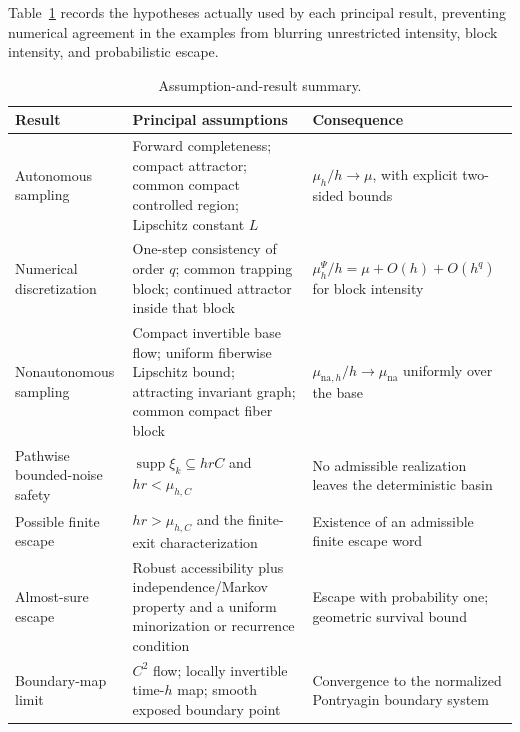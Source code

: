 \documentclass[pdflatex,sn-mathphys-num]{sn-jnl}
\numberwithin{equation}{section}
\theoremstyle{thmstyleone}%
\theoremstyle{definition}
\theoremstyle{remark}
\begin{document}
Table~\ref{tab:assumption-result-summary} records the hypotheses actually used by each principal result, preventing numerical agreement in the examples from blurring unrestricted intensity, block intensity, and probabilistic escape.

\begin{table}[htbp]
    \centering
    \caption{Assumption-and-result summary.}
    \label{tab:assumption-result-summary}
    \begin{tabular}{@{}p{.22\linewidth} p{.36\linewidth} p{.36\linewidth}@{}}
        \toprule
        Result & Principal assumptions & Consequence\\
        \midrule
        Autonomous sampling
        &
        Forward completeness; compact attractor; common compact controlled
        region; Lipschitz constant \(L\)
        &
        \(\mu_h/h\to\mu\), with explicit two-sided bounds
        \\
        Numerical discretization
        &
        One-step consistency of order \(q\); common trapping block;
        continued attractor inside that block
        &
        \(\mu_h^\Psi/h=\mu+O(h)+O(h^q)\) for block intensity
        \\
        Nonautonomous sampling
        &
        Compact invertible base flow; uniform fiberwise Lipschitz bound;
        attracting invariant graph; common compact fiber block
        &
        \(\mu_{\mathrm{na},h}/h\to\mu_{\mathrm{na}}\) uniformly over the base
        \\
        Pathwise bounded-noise safety
        &
        \(\operatorname{supp}\xi_k\subseteq hrC\) and
        \(hr<\mu_{h,C}\)
        &
        No admissible realization leaves the deterministic basin
        \\
        Possible finite escape
        &
        \(hr>\mu_{h,C}\) and the finite-exit characterization
        &
        Existence of an admissible finite escape word
        \\
        Almost-sure escape
        &
        Robust accessibility plus independence/Markov property and a
        uniform minorization or recurrence condition
        &
        Escape with probability one; geometric survival bound
        \\
        Boundary-map limit
        &
        \(C^2\) flow; locally invertible time-\(h\) map; smooth exposed
        boundary point
        &
        Convergence to the normalized Pontryagin boundary system
        \\
        \bottomrule
    \end{tabular}
\end{table}
\end{document}
